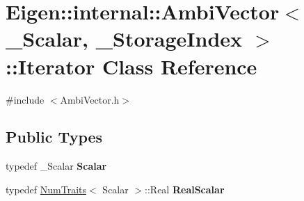 \hypertarget{class_eigen_1_1internal_1_1_ambi_vector_1_1_iterator}{}\section{Eigen\+::internal\+::Ambi\+Vector$<$ \+\_\+\+Scalar, \+\_\+\+Storage\+Index $>$\+::Iterator Class Reference}
\label{class_eigen_1_1internal_1_1_ambi_vector_1_1_iterator}


{\ttfamily \#include $<$Ambi\+Vector.\+h$>$}

\subsection*{Public Types}
\begin{DoxyCompactItemize}
\item 
\mbox{\label{class_eigen_1_1internal_1_1_ambi_vector_1_1_iterator_a4b9558b98ec8e7e2f70550d848bba83e}} 
typedef \+\_\+\+Scalar {\bfseries Scalar}
\item 
\mbox{\label{class_eigen_1_1internal_1_1_ambi_vector_1_1_iterator_afadc74f988834ec6abc9a96e00cce8bd}} 
typedef \mbox{\hyperlink{struct_eigen_1_1_num_traits}{Num\+Traits}}$<$ Scalar $>$\+::Real {\bfseries Real\+Scalar}
\end{DoxyCompactItemize}
